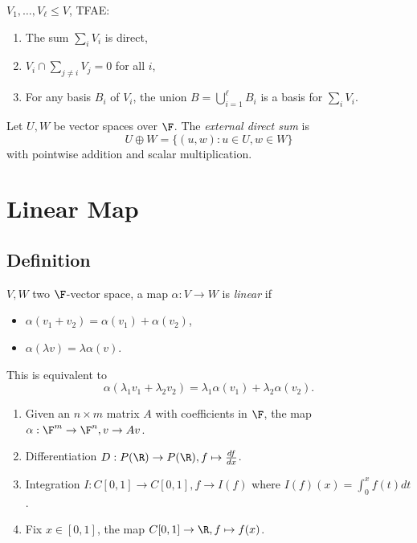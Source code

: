 \documentclass[a4paper]{article}
\theoremstyle{definition}
\begin{document}
\begin{ex}
  \(V_1,\ldots, V_\ell \leq V\), TFAE:
  \begin{enumerate}
  \item The sum \(\sum_i V_i\) is direct,
  \item \(V_i \cap \sum_{j\neq i}V_j = 0\) for all \(i\),
  \item For any basis \(B_i\) of \(V_i\), the union \(B=\bigcup_{i=1}^\ell B_i\) is a basis for \(\sum_i V_i\).
  \end{enumerate}
\end{ex}

\begin{definition}
  Let \(U, W\) be vector spaces over \(\F\). The \emph{external direct sum} is
  \[
    U\oplus W = \{(u,w): u\in U, w\in W\}
  \]
  with pointwise addition and scalar multiplication.
\end{definition}

\section{Linear Map}

\subsection{Definition}

\begin{definition}
  \(V, W\) two \(\F\)-vector space, a map \(\alpha: V\to W\) is \emph{linear} if
  \begin{itemize}
  \item \(\alpha(v_1 + v_2) = \alpha(v_1) + \alpha(v_2)\),
  \item \(\alpha(\lambda v) = \lambda \alpha(v)\).
  \end{itemize}
  This is equivalent to
  \[
\alpha(\lambda_1v_1+ \lambda_2v_2) = \lambda_1\alpha(v_1) + \lambda_2\alpha(v_2).
  \]
\end{definition}

\begin{eg}\leavevmode
  \begin{enumerate}
  \item Given an \(n\times m\) matrix \(A\) with coefficients in \(\F\), the map \(\alpha: \F^m\to \F^n, v\to Av\).
  \item Differentiation \(D: P(\R) \to P(\R), f\mapsto \frac{df}{dx}\).
  \item Integration \(I: C[0,1] \to C[0,1], f\to I(f)\) where \(I(f)(x) = \int_0^x f(t)dt\).
  \item Fix \(x\in [0,1]\), the map \(C[0,1]\to \R, f\mapsto f(x)\).
  \end{enumerate}
\end{eg}
\end{document}

